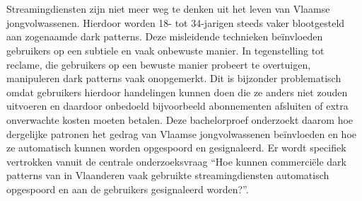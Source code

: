 
%
%
%
%
%

%



\chapter*{}

Streamingdiensten zijn niet meer weg te denken uit het leven van Vlaamse jongvolwassenen. Hierdoor worden 18- tot 34-jarigen steeds vaker blootgesteld aan zogenaamde dark patterns. Deze misleidende technieken beïnvloeden gebruikers op een subtiele en vaak onbewuste manier.
In tegenstelling tot reclame, die gebruikers op een bewuste manier probeert te overtuigen, manipuleren dark patterns vaak onopgemerkt. Dit is bijzonder problematisch omdat gebruikers hierdoor handelingen kunnen doen die ze anders niet zouden uitvoeren en daardoor onbedoeld bijvoorbeeld abonnementen afsluiten of extra onverwachte kosten moeten betalen. Deze bachelorproef onderzoekt daarom hoe dergelijke patronen het gedrag van Vlaamse jongvolwassenen beïnvloeden en hoe ze automatisch kunnen worden opgespoord en gesignaleerd. Er wordt specifiek vertrokken vanuit de centrale onderzoeksvraag ``Hoe kunnen commerciële dark patterns van in Vlaanderen vaak gebruikte streamingdiensten automatisch opgespoord en aan de gebruikers gesignaleerd worden?''.


